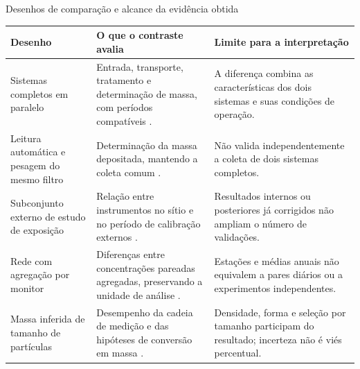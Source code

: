 \begin{quadro*}[tbp]
\caption{Desenhos de comparação e alcance da evidência obtida}\label{qua:desenhos}
\begingroup\singlespacing\fontsize{10}{12}\selectfont
\begin{tabularx}{\textwidth}{|P{.24\textwidth}|P{.34\textwidth}|X|}
\hline\textbf{Desenho} & \textbf{O que o contraste avalia} & \textbf{Limite para a interpretação}\\\hline
Sistemas completos em paralelo & Entrada, transporte, tratamento e determinação de massa, com períodos compatíveis \parencite{rsl201,rsl144}. & A diferença combina as características dos dois sistemas e suas condições de operação.\\\hline
Leitura automática e pesagem do mesmo filtro & Determinação da massa depositada, mantendo a coleta comum \parencite{rsl214}. & Não valida independentemente a coleta de dois sistemas completos.\\\hline
Subconjunto externo de estudo de exposição & Relação entre instrumentos no sítio e no período de calibração externos \parencite{rsl292,rsl427}. & Resultados internos ou posteriores já corrigidos não ampliam o número de validações.\\\hline
Rede com agregação por monitor & Diferenças entre concentrações pareadas agregadas, preservando a unidade de análise \parencite{rsl026}. & Estações e médias anuais não equivalem a pares diários ou a experimentos independentes.\\\hline
Massa inferida de tamanho de partículas & Desempenho da cadeia de medição e das hipóteses de conversão em massa \parencite{rsl288,rsl283}. & Densidade, forma e seleção por tamanho participam do resultado; incerteza não é viés percentual.\\\hline
\end{tabularx}
\endgroup
\end{quadro*}
